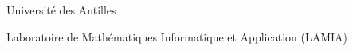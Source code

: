 \begin{titlepage}
    \vspace*{2cm}

    \begin{center}
        Université des Antilles

        Laboratoire de Mathématiques Informatique et Application (LAMIA)
    \end{center}

\end{titlepage}
\ClearShipoutPicture
